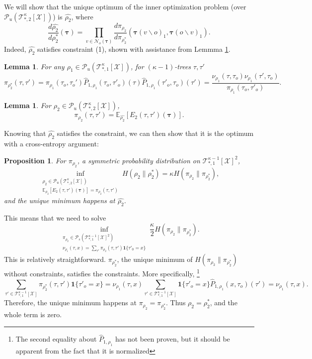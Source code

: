 \documentclass[12pt]{article}
\newtheorem{lemma}[theorem]{Lemma}
\newtheorem{proposition}[theorem]{Proposition}
\newcommand{\TB}{{ \boldsymbol\tau}}
\newcommand{\BS}{\backslash}
\newcommand{\X}{{\mathcal{X}}}
\newcommand{\PP}{{\mathcal{P}}}
\newcommand{\TT}{{\mathcal{T}}}
\newcommand{\EE}{{\mathbb{E}}}
\newcommand{\one}[1]{\mathbf{1}\{#1\}}
\newcommand{\tree}[2]{\TT_{*, #1}^{#2}[\X]}
\newcommand{\mSl}{\PP_u(\TT_{*, 2}^{\kappa}[\X])}
\newcommand{\mEl}{\PP_s(\TT_{*, 1}^{\kappa-1}[\X]^2)}
\newcommand{\mSs}{\PP_u(\TT_{*, 1}^{\kappa}[\X])}
\newcommand{\Sl}{{\rho_2}}
\newcommand{\Slo}{{\rho_2^*}}
\newcommand{\Slh}{{\widehat{\rho_2}}}
\newcommand{\El}{{\pi_\Sl}}
\newcommand{\Elo}{{\pi_\Slo}}
\newcommand{\Ss}{{\rho_1}}
\newcommand{\Sm}{{\nu_{\Ss}}}
\newcommand{\Es}{{\pi_\Ss}}
\newcommand{\UE}{\widehat{P}_{1, \Ss}}
\newcommand{\NB}[1]{{\mathcal{N}_o(#1)}}
\numberwithin{equation}{section}
\begin{document}
We will show that the unique optimum of the inner optimization problem (over $\mSl$) is $\Slh$, where
\begin{equation}
    \frac{d\Slh}{d\Slo}(\TB) = \prod_{v\in\NB{\TB}}\frac{d\El}{d\Elo}(\TB(v\BS o)_1, \TB(o\BS v)_1).
\end{equation}
Indeed, $\Slh$ satisfies constraint (1), shown with assistance from Lemmma \ref{Prp.NNNI-PI-RHO-STAR}.
\begin{lemma}\label{Prp.NNNI-PI-RHO-STAR}
    For any $\Ss\in\mSs$, for $(\kappa-1)$-trees $\tau, \tau'$
    \begin{equation}
        \Elo(\tau,\tau') = \Es(\tau_o, \tau_o')\UE(\tau_o, \tau'_o)(\tau)\UE(\tau'_o, \tau_o)(\tau') = \frac{\Sm(\tau, \tau_o)\Sm(\tau', \tau_o)}{\Es(\tau_o, \tau'_o)}.
    \end{equation}
\end{lemma}
\begin{lemma}\label{Prp.NNNI-RHO-HAT-CNSTR}
    For $\Sl\in\mSl$,
    \begin{equation}
        \El(\tau, \tau') = \EE_\Slh[E_2(\tau, \tau')(\TB)].
    \end{equation}
\end{lemma}
Knowing that $\Slh$ satisfies the constraint, we can then show that it is the optimum with a cross-entropy argument:
\begin{proposition}\label{Prp.NNNI-RHO-HAT-OPT}
    For $\El$, a symmetric probability distribution on $\tree{1}{\kappa-1}^2$,
    \begin{equation*}
        \inf_{\substack{\Sl\in\mSl\\ \EE_\Sl[E_2(\tau,\tau')(\TB)] = \El(\tau,\tau')}} H(\Sl\|\Slo) = \kappa H(\El\|\Elo),
    \end{equation*}
    and the unique minimum happens at $\Slh$.
\end{proposition}
This means that we need to solve
\begin{equation*}
    \inf_{\substack{\El\in\mEl\\ \Sm(\tau, x) = \sum_{\tau'}\El(\tau, \tau')\one{\tau'_0=x}}}\frac\kappa2 H(\El\|\Elo).
\end{equation*}
This is relatively straightforward. $\Elo$, the unique minimum of $H(\El\|\Elo)$ without constraints, satisfies the constraints. More specifically,
\footnote{The second equality about $\UE$ has not been proven, but it should be apparent from the fact that it is normalized}
\begin{equation}
    \sum_{\tau'\in\tree{1}{\kappa-1}} \Elo(\tau, \tau')\one{\tau'_o=x}=\Sm(\tau, x)\sum_{\tau'\in\tree{1}{\kappa-1}} \one{\tau'_o=x}\UE(x, \tau_o)(\tau')=\Sm(\tau, x).
\end{equation}
Therefore, the unique minimum happens at $\El=\Elo$. Thus $\Sl=\Slo$, and the whole term is zero.
\end{document}
